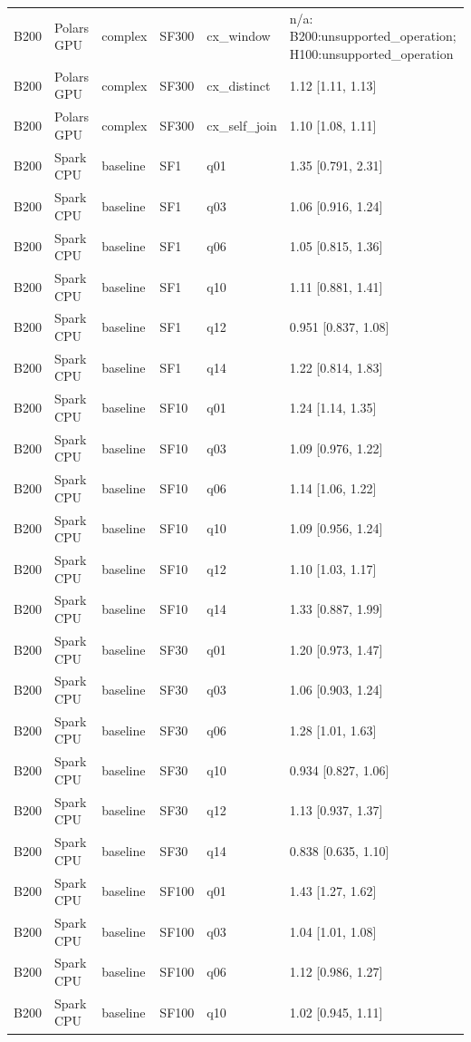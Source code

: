 \begin{longtable}{llllll}
B200 & Polars GPU & complex & SF300 & cx\_window & n/a: B200:unsupported\_operation; H100:unsupported\_operation \\
B200 & Polars GPU & complex & SF300 & cx\_distinct & 1.12 [1.11, 1.13] \\
B200 & Polars GPU & complex & SF300 & cx\_self\_join & 1.10 [1.08, 1.11] \\
B200 & Spark CPU & baseline & SF1 & q01 & 1.35 [0.791, 2.31] \\
B200 & Spark CPU & baseline & SF1 & q03 & 1.06 [0.916, 1.24] \\
B200 & Spark CPU & baseline & SF1 & q06 & 1.05 [0.815, 1.36] \\
B200 & Spark CPU & baseline & SF1 & q10 & 1.11 [0.881, 1.41] \\
B200 & Spark CPU & baseline & SF1 & q12 & 0.951 [0.837, 1.08] \\
B200 & Spark CPU & baseline & SF1 & q14 & 1.22 [0.814, 1.83] \\
B200 & Spark CPU & baseline & SF10 & q01 & 1.24 [1.14, 1.35] \\
B200 & Spark CPU & baseline & SF10 & q03 & 1.09 [0.976, 1.22] \\
B200 & Spark CPU & baseline & SF10 & q06 & 1.14 [1.06, 1.22] \\
B200 & Spark CPU & baseline & SF10 & q10 & 1.09 [0.956, 1.24] \\
B200 & Spark CPU & baseline & SF10 & q12 & 1.10 [1.03, 1.17] \\
B200 & Spark CPU & baseline & SF10 & q14 & 1.33 [0.887, 1.99] \\
B200 & Spark CPU & baseline & SF30 & q01 & 1.20 [0.973, 1.47] \\
B200 & Spark CPU & baseline & SF30 & q03 & 1.06 [0.903, 1.24] \\
B200 & Spark CPU & baseline & SF30 & q06 & 1.28 [1.01, 1.63] \\
B200 & Spark CPU & baseline & SF30 & q10 & 0.934 [0.827, 1.06] \\
B200 & Spark CPU & baseline & SF30 & q12 & 1.13 [0.937, 1.37] \\
B200 & Spark CPU & baseline & SF30 & q14 & 0.838 [0.635, 1.10] \\
B200 & Spark CPU & baseline & SF100 & q01 & 1.43 [1.27, 1.62] \\
B200 & Spark CPU & baseline & SF100 & q03 & 1.04 [1.01, 1.08] \\
B200 & Spark CPU & baseline & SF100 & q06 & 1.12 [0.986, 1.27] \\
B200 & Spark CPU & baseline & SF100 & q10 & 1.02 [0.945, 1.11] \\

\end{longtable}
